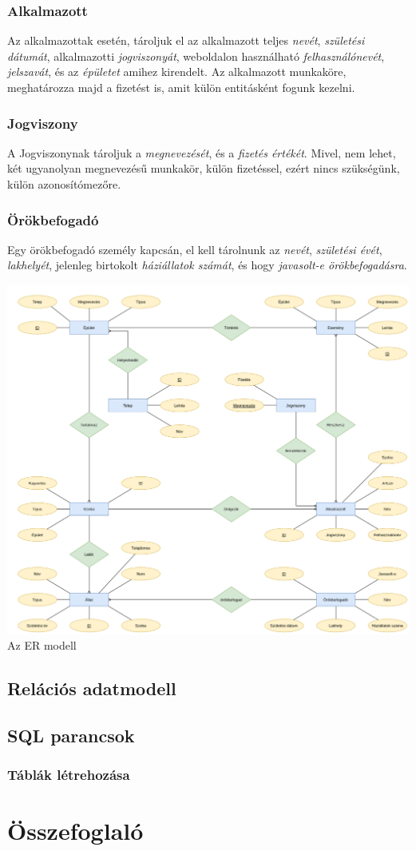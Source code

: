 \documentclass[a4paper,12pt]{article}
\begin{document}
\subsubsection*{Alkalmazott}
Az alkalmazottak esetén, tároljuk el az alkalmazott teljes \textit{nevét}, \textit{születési dátumát}, alkalmazotti \textit{jogviszonyát}, weboldalon használható \textit{felhasználónevét}, \textit{jelszavát}, és az \textit{épületet} amihez kirendelt. Az alkalmazott munkaköre, meghatározza majd a fizetést is, amit külön entitásként fogunk kezelni.

\subsubsection*{Jogviszony}
A Jogviszonynak tároljuk a \textit{megnevezését}, és a \textit{fizetés értékét}. Mivel, nem lehet, két ugyanolyan megnevezésű munkakör, külön fizetéssel, ezért nincs szükségünk, külön azonosítómezőre. 

\subsubsection*{Örökbefogadó}
Egy örökbefogadó személy kapcsán, el kell tárolnunk az \textit{nevét}, \textit{születési évét}, \textit{lakhelyét}, jelenleg birtokolt \textit{háziállatok számát},  és hogy \textit{javasolt-e örökbefogadásra}.

\begin{center}
	\includegraphics[width = 17cm]{"SQL_tervezés.png"} \\
	{\small Az ER modell}
\end{center}


\subsection{Relációs adatmodell}
\subsection{SQL parancsok}
\subsubsection{Táblák létrehozása}
\section{Összefoglaló}
\end{document}
